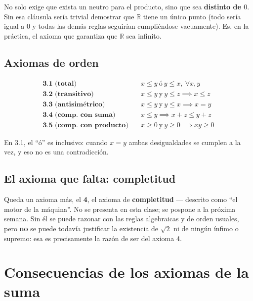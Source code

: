 \documentclass[12pt,a4paper]{article}
\begin{document}
\begin{warnbox}
No solo exige que exista un neutro para el producto, sino que sea
\textbf{distinto de $0$}. Sin esa cláusula sería trivial demostrar que
$\mathbb{R}$ tiene un único punto (todo sería igual a $0$ y todas las demás
reglas seguirían cumpliéndose vacuamente). Es, en la práctica, el axioma que
garantiza que $\mathbb{R}$ sea infinito.
\end{warnbox}

\subsection{Axiomas de orden}

\begin{align}
\textbf{3.1 (total)} &\quad x\le y \ \text{ó} \ y \le x, \ \forall x,y \\
\textbf{3.2 (transitivo)} &\quad x\le y \ \text{y} \ y\le z \implies x\le z \\
\textbf{3.3 (antisimétrico)} &\quad x\le y \ \text{y} \ y\le x \implies x=y \\
\textbf{3.4 (comp.\ con suma)} &\quad x\le y \implies x+z \le y+z \\
\textbf{3.5 (comp.\ con producto)} &\quad x\ge 0 \ \text{y} \ y\ge 0 \implies xy \ge 0
\end{align}

\begin{notebox}[El ``ó'' es inclusivo]
En 3.1, el ``ó'' es inclusivo: cuando $x=y$ ambas desigualdades se cumplen a
la vez, y eso no es una contradicción.
\end{notebox}

\subsection{El axioma que falta: completitud}

Queda un axioma más, el \textbf{4}, el axioma de \textbf{completitud} ---
descrito como ``el motor de la máquina''. No se presenta en esta clase; se
pospone a la próxima semana. Sin él se puede razonar con las reglas
algebraicas y de orden usuales, pero \textbf{no} se puede todavía justificar
la existencia de $\sqrt{2}$ ni de ningún ínfimo o supremo: esa es
precisamente la razón de ser del axioma 4.

\section{Consecuencias de los axiomas de la suma}
\end{document}
